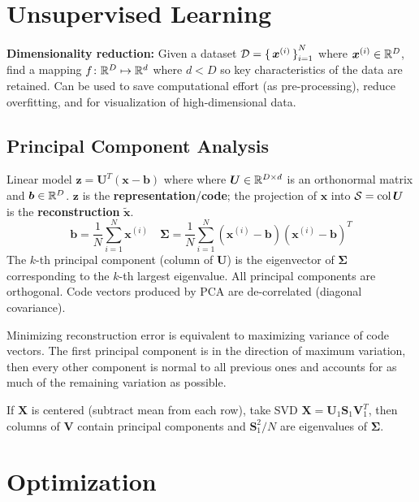 \documentclass[twocolumn, 8pt]{extarticle}
\begin{document}
\hrulefill
\section{Unsupervised Learning} %

\textbf{Dimensionality reduction:} Given a dataset $\mathcal D = \set{\bm x^{(i)}}_{i = 1}^N$ where $\bm x^{(i)} \in
\mathbb{R}^D$, find a mapping $f \colon \mathbb{R}^D \mapsto \mathbb{R}^d$ where $d < D$ so key characteristics of the data are
retained. Can be used to save computational effort (as pre-processing), reduce overfitting, and for visualization of
high-dimensional data.

\subsection{Principal Component Analysis} %

Linear model \(\bm z = \bm U^T(\bm x - \bm b)\) where where $\bm U \in \mathbb{R}^{D \times d}$ is an orthonormal matrix and
$\bm b \in \mathbb{R}^D$. \(\bm z\) is the \textbf{representation}/\textbf{code}; the projection of \(\bm x\) into
\(\mathcal S = \operatorname{col}\bm U\) is the \textbf{reconstruction} \(\tilde{\bm x}\).
\[
    \bm b = \frac{1}{N}\sum _{i = 1}^N \bm x^{(i)}
    \quad \bm\Sigma = \frac{1}{N}\sum _{i = 1}^N (\bm x^{(i)} - \bm b)(\bm x^{(i)} - \bm b)^T
\]
The \(k\)-th principal component (column of \(\bm U\)) is the eigenvector of \(\bm\Sigma\) corresponding to the \(k\)-th
largest eigenvalue. All principal components are orthogonal. Code vectors produced by PCA are de-correlated (diagonal
covariance).

Minimizing reconstruction error is equivalent to maximizing variance of code vectors. The first principal component is
in the direction of maximum variation, then every other component is normal to all previous ones and accounts for as
much of the remaining variation as possible.

If \(\bm X\) is centered (subtract mean from each row), take SVD \(\bm X = \bm U_1\bm S_1\bm V_1^T\), then columns of
\(\bm V\) contain principal components and \(\bm S_1^2/N\) are eigenvalues of \(\bm\Sigma\).

\hrulefill
\section{Optimization} %
\end{document}

